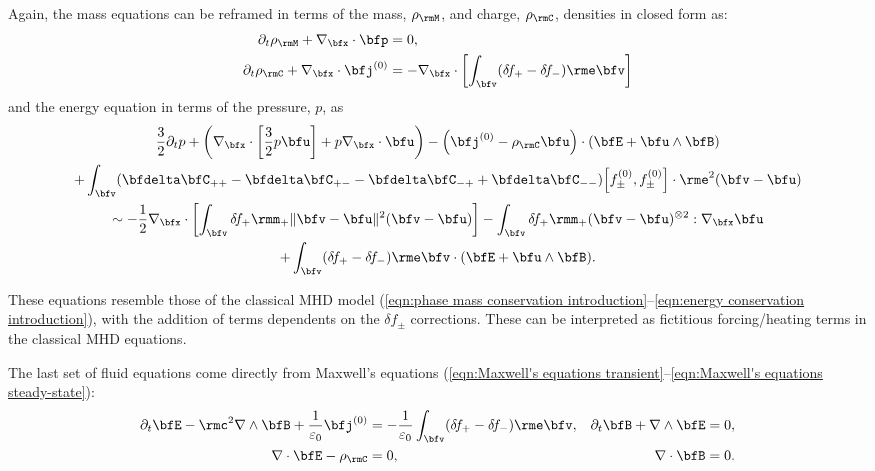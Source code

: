     Again, the mass equations can be reframed in terms of the mass, $\rho_{\rmM}$, and charge, $\rho_{\rmC}$, densities in closed form as:
    \begin{align}
              \partial_{t}\rho_{\rmM} + \nabla_{\bfx}\cdot\bfp  &=  0,  \\
        \partial_{t}\rho_{\rmC} + \nabla_{\bfx}\cdot\bfj^{(0)}  &=  - \nabla_{\bfx}\cdot\left[\int_{\bfv}(\delta\!f_{+} - \delta\!f_{-})\rme\bfv\right]  \label{eqn:PiC-coupled charge conservation}
    \end{align}
    and the energy equation in terms of the pressure, $p$, as
    \begin{multline}\label{eqn:PiC-coupled pressure conservation}
        \frac{3}{2}\partial_{t}p + \left(\nabla_{\bfx}\cdot\left[\frac{3}{2}p\bfu\right] + p\nabla_{\bfx}\cdot\bfu\right) - \left(\bfj^{(0)} - \rho_{\rmC}\bfu\right)\cdot(\bfE + \bfu\wedge\bfB)  \\
        + \int_{\bfv}(\bfdelta\bfC_{++} - \bfdelta\bfC_{+-} - \bfdelta\bfC_{-+} + \bfdelta\bfC_{--})\!\left[f_{\pm}^{(0)}, f_{\pm}^{(0)}\right]\cdot\rme^{2}(\bfv - \bfu)  \\
        \sim  - \frac{1}{2}\nabla_{\bfx}\cdot\left[\int_{\bfv}\delta\!f_{+}\rmm_{+}\|\bfv - \bfu\|^{2}(\bfv - \bfu)\right] - \int_{\bfv}\delta\!f_{+}\rmm_{+}(\bfv - \bfu)^{\otimes 2}:\nabla_{\bfx}\bfu  \\
        + \int_{\bfv}(\delta\!f_{+} - \delta\!f_{-})\rme\bfv\cdot(\bfE + \bfu\wedge\bfB).
    \end{multline}
    
    These equations resemble those of the classical MHD model (\ref{eqn:phase mass conservation introduction}--\ref{eqn:energy conservation introduction}), with the addition of terms dependents on the $\delta\!f_{\pm}$ corrections. These can be interpreted as fictitious forcing/heating terms in the classical MHD equations.

    The last set of fluid equations come directly from Maxwell's equations (\ref{eqn:Maxwell's equations transient}--\ref{eqn:Maxwell's equations steady-state}):
    \begin{align}
        \partial_{t}\bfE - \rmc^{2}\nabla\wedge\bfB + \frac{1}{\varepsilon_{0}}\bfj^{(0)}  &=  - \frac{1}{\varepsilon_{0}}\int_{\bfv}(\delta\!f_{+} - \delta\!f_{-})\rme\bfv,  &
                                                      \partial_{t}\bfB + \nabla\wedge\bfE  &=  0,  \\
                                                            \nabla\cdot\bfE - \rho_{\rmC}  &=  0,  &
                                                                          \nabla\cdot\bfB  &=  0.  \label{eqn:PiC-coupled Maxwell's equations steady-state}
    \end{align}

